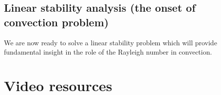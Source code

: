 \vspace{0.5cm}
\vspace{0.5cm}


\subsection{Linear stability analysis (the onset of convection problem)\label{ss:sarb}} 

We are now ready to solve a linear stability problem which will provide fundamental
insight in the role of the Rayleigh number in convection. 







\newpage
\section{Video resources}

